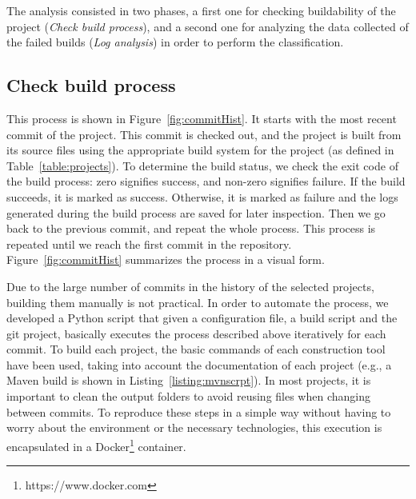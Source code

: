 The analysis consisted in two phases, a first one for checking buildability of the project (\textit{Check build process}), and a second one for analyzing the data collected of the failed builds (\textit{Log analysis}) in order to perform the classification.


\subsection{Check build process}

This process is shown in Figure~\ref{fig:commitHist}.
It starts with the most recent commit of the project.
This commit is checked out, and the project is built from its source files using the appropriate build system for the project (as defined in Table~\ref{table:projects}).
To determine the build status, we check the exit code of the build process: zero signifies success, and non-zero signifies failure.
If the build succeeds, it is marked as success.
Otherwise, it is marked as failure and the logs generated during the build process are saved for later inspection.
Then we go back to the previous commit, and repeat the whole process.
This process is repeated until we reach the first commit in the repository.
Figure~\ref{fig:commitHist} summarizes the process in a visual form.


Due to the large number of commits in the history of the selected projects, building them manually is not practical.
In order to automate the process, we developed a Python script that given a configuration file, a build script and the git project, basically executes the process described above iteratively for each commit.
To build each project, the basic commands of each construction tool have been used, taking into account the documentation of each project (e.g., a Maven build is shown in Listing~\ref{listing:mvnscrpt}).
In most projects, it is important to clean the output folders to avoid reusing files when changing between commits.
To reproduce these steps in a simple way without having to worry about the environment or the necessary technologies, this execution is encapsulated in a Docker\footnote{https://www.docker.com} container.

